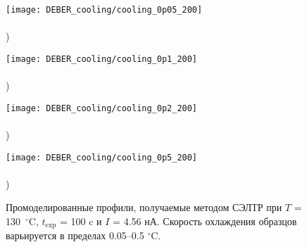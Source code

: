 \begin{figure}[h]
	\begin{minipage}{0.48\textwidth}
		\texttt{[image: DEBER\_cooling/cooling\_0p05\_200]} \\
		\vspace{-13em} \\ ) \\ \vspace{13em}
	\end{minipage}
	\begin{minipage}{0.48\textwidth}
		\texttt{[image: DEBER\_cooling/cooling\_0p1\_200]} \\
		\vspace{-13em} \\ ) \\ \vspace{13em}
	\end{minipage}
	
	\vspace{-3em}
	
	\begin{minipage}{0.48\textwidth}
		\texttt{[image: DEBER\_cooling/cooling\_0p2\_200]} \\
		\vspace{-13em} \\ ) \\ \vspace{13em}
	\end{minipage}
	\begin{minipage}{0.48\textwidth}
		\texttt{[image: DEBER\_cooling/cooling\_0p5\_200]} \\
		\vspace{-13em} \\ ) \\ \vspace{13em}
	\end{minipage}
	\vspace{-3em}
	\caption{Промоделированные профили, получаемые методом СЭЛТР при $T$ = 130~$^\circ$C, $t_\mathrm{exp}$ = 100 c и $I$ = 4.56 нА. Скорость охлаждения образцов варьируется в пределах 0.05--0.5 $^\circ$C.}
	\label{fig:DEBER_cooling}
\end{figure}
